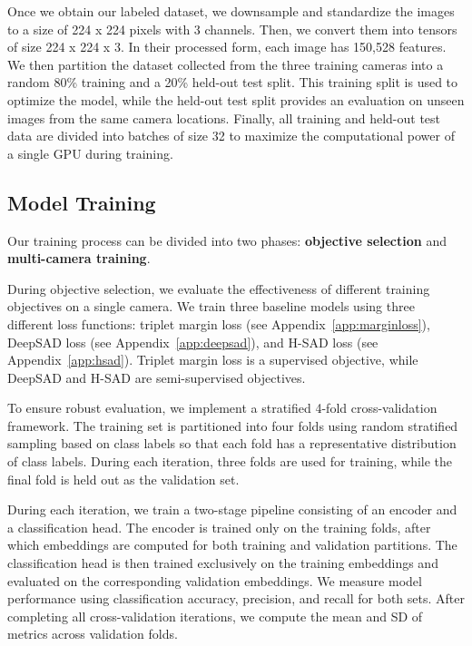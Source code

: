 \documentclass[remotesensing,article,submit,moreauthors]{Definitions/mdpi}
\begin{document}
Once we obtain our labeled dataset, we downsample and standardize the images to a size of 224 x 224 pixels with 3 channels. Then, we convert them into tensors of size 224 x 224 x 3. In their processed form, each image has 150,528 features.  We then partition the dataset collected from the three training cameras into a random 80\% training and a 20\% held-out test split. This training split is used to optimize the model, while the held-out test split provides an evaluation on unseen images from the same camera locations. Finally, all training and held-out test data are divided into batches of size 32 to maximize the computational power of a single \ac{GPU} during training. 

\subsection{Model Training}

Our training process can be divided into two phases: \textbf{objective selection} and \textbf{multi-camera training}. 

During objective selection, we evaluate the effectiveness of different training objectives on a single camera. We train three baseline models using three different loss functions: triplet margin loss (see Appendix~\ref{app:marginloss}), \ac{DeepSAD} loss (see Appendix~\ref{app:deepsad}), and \ac{H-SAD} loss (see Appendix~\ref{app:hsad}). Triplet margin loss is a supervised objective, while \ac{DeepSAD} and \ac{H-SAD} are semi-supervised objectives. 

To ensure robust evaluation, we implement a stratified 4-fold cross-validation framework. The training set is partitioned into four folds using random stratified sampling based on class labels so that each fold has a representative distribution of class labels. During each iteration, three folds are used for training, while the final fold is held out as the validation set. 

During each iteration, we train a two-stage pipeline consisting of an encoder and a classification head. The encoder is trained only on the training folds, after which embeddings are computed for both training and validation partitions. The classification head is then trained exclusively on the training embeddings and evaluated on the corresponding validation embeddings. We measure model performance using classification accuracy, precision, and recall for both sets. After completing all cross-validation iterations, we compute the mean and \ac{SD} of metrics across validation folds. 
\end{document}
